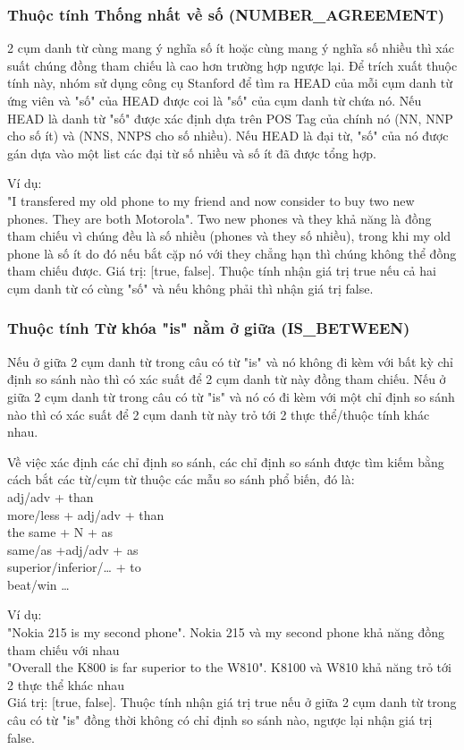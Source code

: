 \documentclass[12pt]{extarticle}
\begin{document}
			\subsubsection*{Thuộc tính Thống nhất về số (NUMBER\_AGREEMENT)}
				\par 2 cụm danh từ cùng mang ý nghĩa số ít hoặc cùng mang ý nghĩa số nhiều thì xác suất chúng đồng tham chiếu là cao hơn trường hợp ngược lại. Để trích xuất thuộc tính này, nhóm sử dụng công cụ Stanford để tìm ra HEAD của mỗi cụm danh từ ứng viên và "số" của HEAD được coi là "số" của cụm danh từ chứa nó. Nếu HEAD là danh từ "số" được xác định dựa trên POS Tag của chính nó (NN, NNP cho số ít) và (NNS, NNPS cho số nhiều). Nếu HEAD là đại từ, "số" của nó được gán dựa vào một list các đại từ số nhiều và số ít đã được tổng hợp.
				\par Ví dụ:
				\\"I transfered my old phone to my friend and now consider to buy two new phones. They are both Motorola". Two new phones và they khả năng là đồng tham chiếu vì chúng đều là số nhiều (phones và they số nhiều), trong khi my old phone là số ít do đó nếu bắt cặp nó với they chẳng hạn thì chúng không thể đồng tham chiếu được. 
				Giá trị: [true, false].
				Thuộc tính nhận giá trị true nếu cả hai cụm danh từ có cùng "số" và nếu không phải thì nhận giá trị false.

			\subsubsection*{Thuộc tính Từ khóa "is" nằm ở giữa (IS\_BETWEEN)}
				\par Nếu ở giữa 2 cụm danh từ trong câu có từ "is" và nó không đi kèm với bất kỳ chỉ định so sánh nào thì có xác suất để 2 cụm danh từ này đồng tham chiếu. Nếu ở giữa 2 cụm danh từ trong câu có từ "is" và nó có đi kèm với một chỉ định so sánh nào thì có xác suất để 2 cụm danh từ này trỏ tới 2 thực thể/thuộc tính khác nhau.
				\par Về việc xác định các chỉ định so sánh, các chỉ định so sánh được tìm kiếm bằng cách bắt các từ/cụm từ thuộc các mẫu so sánh phổ biến, đó là:
				\\adj/adv + than
				\\more/less + adj/adv + than
				\\the same + N + as
				\\same/as +adj/adv + as
				\\superior/inferior/… + to
				\\beat/win …
				\par Ví dụ: 
				\\"Nokia 215 is my second phone". Nokia 215 và my second phone khả năng đồng tham chiếu với nhau
				\\"Overall the K800 is far superior to the W810". K8100 và W810 khả năng trỏ tới 2 thực thể khác nhau
				\\Giá trị: [true, false]. Thuộc tính nhận giá trị true nếu ở giữa 2 cụm danh từ trong câu có từ "is" đồng thời không có chỉ định so sánh nào, ngược lại nhận giá trị false.
\end{document}
